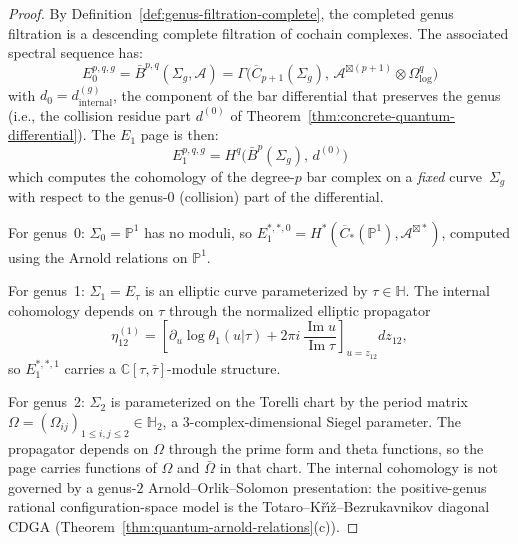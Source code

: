 \begin{proof}
By Definition~\ref{def:genus-filtration-complete}, the completed
genus filtration is a descending complete filtration of cochain
complexes. The associated spectral sequence has:
\[
E_0^{p,q,g} = \bar{B}^{p,q}(\Sigma_g, \mathcal{A}) = \Gamma\bigl(\overline{C}_{p+1}(\Sigma_g),\, \mathcal{A}^{\boxtimes(p+1)} \otimes \Omega^q_{\log}\bigr)
\]
with $d_0 = d^{(g)}_{\mathrm{internal}}$, the component of the bar differential that preserves the genus (i.e., the collision residue part $d^{(0)}$ of Theorem~\ref{thm:concrete-quantum-differential}). The $E_1$ page is then:
\[
E_1^{p,q,g} = H^q\bigl(\bar{B}^p(\Sigma_g),\, d^{(0)}\bigr)
\]
which computes the cohomology of the degree-$p$ bar complex on a \emph{fixed} curve~$\Sigma_g$ with respect to the genus-0 (collision) part of the differential.

For genus~0: $\Sigma_0 = \mathbb{P}^1$ has no moduli, so $E_1^{*,*,0} = H^*(\overline{C}_*(\mathbb{P}^1), \mathcal{A}^{\boxtimes *})$, computed using the Arnold relations on $\mathbb{P}^1$.

For genus~1: $\Sigma_1 = E_\tau$ is an elliptic curve parameterized by $\tau \in \mathbb{H}$. The internal cohomology depends on $\tau$ through the normalized elliptic propagator
\[
\eta_{12}^{(1)}
=
\left[
\partial_u\log\theta_1(u|\tau)
+2\pi i\,\frac{\operatorname{Im}u}{\operatorname{Im}\tau}
\right]_{u=z_{12}}dz_{12},
\]
so $E_1^{*,*,1}$ carries a $\mathbb{C}[\tau,\bar{\tau}]$-module structure.

For genus~2: $\Sigma_2$ is parameterized on the Torelli chart by
the period matrix
$\Omega=(\Omega_{ij})_{1\leq i,j\leq2}\in\mathbb H_2$, a
$3$-complex-dimensional Siegel parameter. The propagator depends on
$\Omega$ through the prime form and theta functions, so the page
carries functions of $\Omega$ and $\bar\Omega$ in that chart. The
internal cohomology is not governed by a genus-$2$
Arnold--Orlik--Solomon presentation: the positive-genus rational
configuration-space model is the
Totaro--K\v{r}\'{\i}\v{z}--Bezrukavnikov diagonal CDGA
(Theorem~\ref{thm:quantum-arnold-relations}(c)).
\end{proof}

